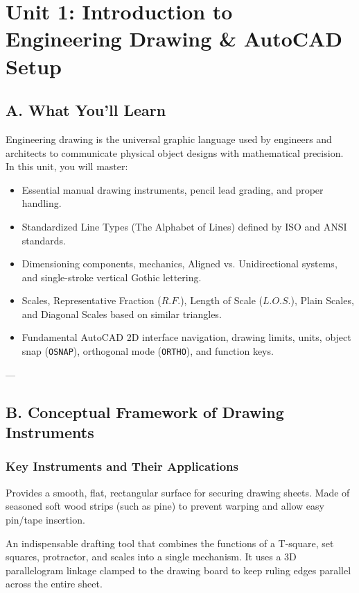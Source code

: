 \chapter{Unit 1: Introduction to Engineering Drawing \& AutoCAD Setup}

\section{A. What You'll Learn}
Engineering drawing is the universal graphic language used by engineers and architects to communicate physical object designs with mathematical precision. In this unit, you will master:
\begin{itemize}
    \item Essential manual drawing instruments, pencil lead grading, and proper handling.
    \item Standardized Line Types (The Alphabet of Lines) defined by ISO and ANSI standards.
    \item Dimensioning components, mechanics, Aligned vs. Unidirectional systems, and single-stroke vertical Gothic lettering.
    \item Scales, Representative Fraction ($R.F.$), Length of Scale ($L.O.S.$), Plain Scales, and Diagonal Scales based on similar triangles.
    \item Fundamental AutoCAD 2D interface navigation, drawing limits, units, object snap (\texttt{OSNAP}), orthogonal mode (\texttt{ORTHO}), and function keys.
\end{itemize}

---

\section{B. Conceptual Framework of Drawing Instruments}

\subsection{Key Instruments and Their Applications}

\begin{definition}
Provides a smooth, flat, rectangular surface for securing drawing sheets. Made of seasoned soft wood strips (such as pine) to prevent warping and allow easy pin/tape insertion.
\end{definition}

\begin{definition}
An indispensable drafting tool that combines the functions of a T-square, set squares, protractor, and scales into a single mechanism. It uses a 3D parallelogram linkage clamped to the drawing board to keep ruling edges parallel across the entire sheet.
\end{definition}

